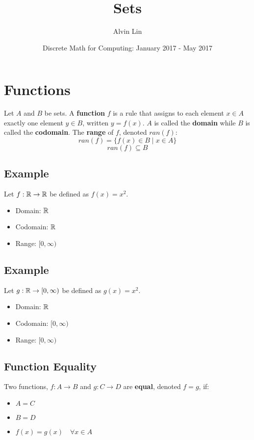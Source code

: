 \documentclass[letterpaper, 12pt]{math}
\title{Sets}
\author{Alvin Lin}
\date{Discrete Math for Computing: January 2017 - May 2017}
\begin{document}
\maketitle

\section*{Functions}
Let \( A \) and \( B \) be sets. A \textbf{function} \( f \) is a rule that
assigns to each element \( x \in A \) exactly one element \( y \in B \),
written \( y = f(x) \). \( A \) is called the \textbf{domain} while \( B \)
is called the \textbf{codomain}. The \textbf{range} of \( f \), denoted
\( ran(f) \):
\[ ran(f) = \{f(x) \in B\mid x \in A \} \]
\[ ran(f) \subseteq B \]

\subsection*{Example}
Let \( f:\mathbb{R}\to\mathbb{R} \) be defined as \( f(x) = x^{2} \).
\begin{itemize}
  \item Domain: \( \mathbb{R} \)
  \item Codomain: \( \mathbb{R} \)
  \item Range: \( \big[0,\infty\big) \)
\end{itemize}

\subsection*{Example}
Let \( g:\mathbb{R}\to[0,\infty) \) be defined as \( g(x) = x^{2} \).
\begin{itemize}
  \item Domain: \( \mathbb{R} \)
  \item Codomain: \( \big[0,\infty\big) \)
  \item Range: \( \big[0,\infty\big) \)
\end{itemize}

\subsection*{Function Equality}
Two functions, \( f:A\to B \) and \( g:C\to D \) are \textbf{equal}, denoted
\( f = g \), if:
\begin{itemize}
  \item \( A = C \)
  \item \( B = D \)
  \item \( f(x) = g(x) \quad \forall{x}\in A \)
\end{itemize}
\end{document}
